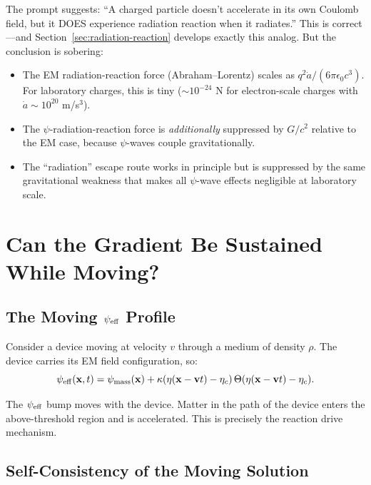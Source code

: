 \documentclass[11pt]{article}
\newcommand{\psieff}{\psi_{\rm eff}}
\newcommand{\etac}{\eta_c}
\begin{document}
The prompt suggests: ``A charged particle doesn't accelerate in its own
Coulomb field, but it DOES experience radiation reaction when it
radiates.'' This is correct---and Section~\ref{sec:radiation-reaction}
develops exactly this analog. But the conclusion is sobering:

\begin{itemize}
\item The EM radiation-reaction force (Abraham--Lorentz) scales as
  $q^2 \dot{a}/(6\pi\epsilon_0 c^3)$. For laboratory charges, this is
  tiny ($\sim 10^{-24}$ N for electron-scale charges with
  $\dot{a} \sim 10^{20}$ m/s$^3$).

\item The $\psi$-radiation-reaction force is \emph{additionally}
  suppressed by $G/c^2$ relative to the EM case, because $\psi$-waves
  couple gravitationally.

\item The ``radiation'' escape route works in principle but is suppressed
  by the same gravitational weakness that makes all
  $\psi$-wave effects negligible at laboratory scale.
\end{itemize}

\section{Can the Gradient Be Sustained While Moving?}\label{sec:sustain}

\subsection{The Moving $\psieff$ Profile}

Consider a device moving at velocity $v$ through a medium of density
$\rho$. The device carries its EM field configuration, so:
\begin{equation}
\psieff(\mathbf{x},t) = \psi_{\rm mass}(\mathbf{x})
+ \kappa(\eta(\mathbf{x} - \mathbf{v}t) - \etac)
\,\Theta(\eta(\mathbf{x} - \mathbf{v}t) - \etac).
\end{equation}

The $\psieff$ bump moves with the device. Matter in the path of the
device enters the above-threshold region and is accelerated. This is
precisely the reaction drive mechanism.

\subsection{Self-Consistency of the Moving Solution}
\end{document}
